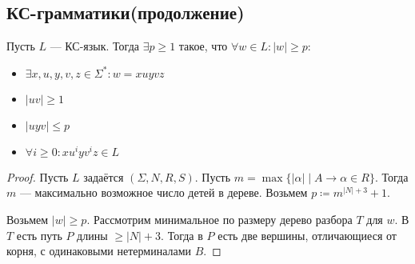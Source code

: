 \subsection{КС-грамматики(продолжение)}
\begin{lemma}[о накачке]
  Пусть $L$ --- КС-язык. Тогда $\exists p \geq 1$ такое, что $\forall w \in L\colon |w| \geq p$:
  \begin{itemize}
    \item $\exists x, u, y, v, z \in \Sigma^{*}\colon w = x u y v z$
    \item $|uv| \geq 1$
    \item $|uyv| \leq p$
    \item $\forall i \geq 0\colon xu^iyv^iz \in L$
  \end{itemize}
\end{lemma}
\begin{proof} 
Пусть $L$ задаётся $(\Sigma, N, R, S)$.
Пусть $m = \max \{|\alpha| \; | \; A \to \alpha \in R\}$. Тогда $m$ --- максимально возможное число детей в дереве. Возьмем $p \coloneqq m^{|N| + 3} + 1$. 

Возьмем $|w| \geq p$. Рассмотрим минимальное по размеру дерево разбора $T$ для $w$. В $T$ есть путь $P$ длины $\geq |N| + 3$. Тогда в $P$ есть две вершины, отличающиеся от корня, с одинаковыми нетерминалами $B$.


\center
\begin{tikzpicture}[x=0.75pt,y=0.75pt,yscale=-1,xscale=1]


\end{tikzpicture}
\end{proof}
